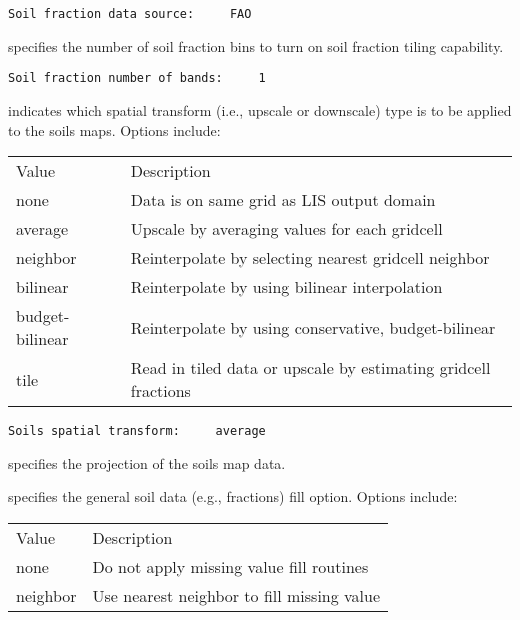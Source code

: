  \begin{Verbatim}[frame=single]
Soil fraction data source:     FAO
 \end{Verbatim}

 
  specifies the number of
 soil fraction bins to turn on soil fraction tiling capability.

 

 \begin{Verbatim}[frame=single]
Soil fraction number of bands:     1
 \end{Verbatim}

 
  indicates which spatial transform
 (i.e., upscale or downscale) type is to be applied to the soils
 maps.  Options include:

 \begin{tabular}{ll}
 Value   & Description                                           \\
 none      & Data is on same grid as LIS output domain           \\
 average   & Upscale by averaging values for each gridcell       \\
 neighbor  & Reinterpolate by selecting nearest gridcell neighbor \\
 bilinear  & Reinterpolate by using bilinear interpolation        \\
 budget-bilinear & Reinterpolate by using conservative, budget-bilinear \\
 tile      &  Read in tiled data or upscale by estimating gridcell
              fractions                                            \\
 \end{tabular}
 

 \begin{Verbatim}[frame=single]
Soils spatial transform:     average 
 \end{Verbatim}

 
  specifies the projection of the
 soils map data.

  specifies the general soil
 data (e.g., fractions) fill option.  Options include:

 \begin{tabular}{ll}
 Value    & Description                                 \\
 none     &  Do not apply missing value fill routines   \\
 neighbor &  Use nearest neighbor to fill missing value \\
 \end{tabular}

